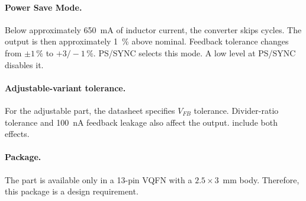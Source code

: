 \paragraph{Power Save Mode.} Below approximately
\SI{650}{\milli\ampere} of inductor current, the converter skips cycles. The
output is then approximately \SI{1}{\percent} above nominal. Feedback tolerance
changes from $\pm1\,\%$ to $+3/-1\,\%$. PS/SYNC selects this mode. A low level
at PS/SYNC disables it.

\paragraph{Adjustable-variant tolerance.} For the adjustable part, the
datasheet specifies $V_{FB}$ tolerance. Divider-ratio tolerance and
\SI{100}{\nano\ampere} feedback leakage also affect the output.
 include both effects.

\paragraph{Package.} The part is available only in a 13-pin VQFN with a
$2.5\times3$~\si{\milli\meter} body. Therefore, this package is a design
requirement.
